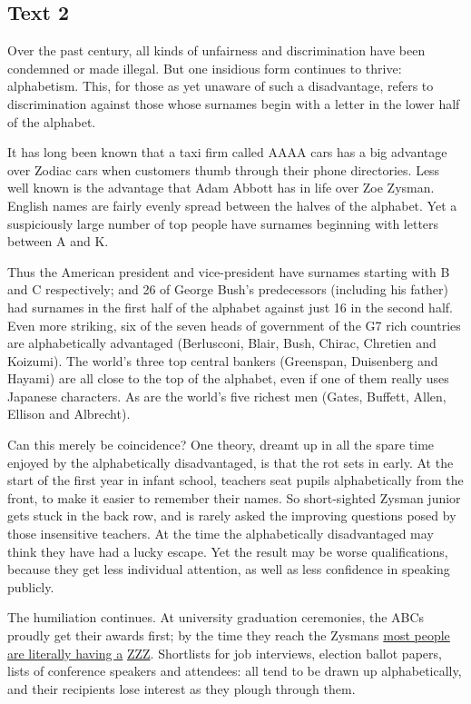 \documentclass[UTF8,11pt]{ctexart}
\begin{document}
\subsection*{\textbf{Text 2}}


Over the past century, all kinds of unfairness and discrimination have been condemned or made illegal. But one insidious form continues to thrive: alphabetism. This, for those as yet unaware of such a disadvantage, refers to discrimination against those whose surnames begin with a letter in the lower half of the alphabet.


It has long been known that a taxi firm called AAAA cars has a big advantage over Zodiac cars when customers thumb through their phone directories. Less well known is the advantage that Adam Abbott has in life over Zoe Zysman. English names are fairly evenly spread between the halves of the alphabet. Yet a suspiciously large number of top people have surnames beginning with letters between A and K.


Thus the American president and vice-president have surnames starting with B and C respectively; and 26 of George Bush’s predecessors (including his father) had surnames in the first half of the alphabet against just 16 in the second half. Even more striking, six of the seven heads of government of the G7 rich countries are alphabetically advantaged (Berlusconi, Blair, Bush, Chirac, Chretien and Koizumi). The world’s three top central bankers (Greenspan, Duisenberg and Hayami) are all close to the top of the alphabet, even if one of them really uses Japanese characters. As are the world’s five richest men (Gates, Buffett, Allen, Ellison and Albrecht).


Can this merely be coincidence? One theory, dreamt up in all the spare time enjoyed by the alphabetically disadvantaged, is that the rot sets in early. At the start of the first year in infant school, teachers seat pupils alphabetically from the front, to make it easier to remember their names. So short-sighted Zysman junior gets stuck in the back row, and is rarely asked the improving questions posed by those insensitive teachers. At the time the alphabetically disadvantaged may think they have had a lucky escape. Yet the result may be worse qualifications, because they get less individual attention, as well as less confidence in speaking publicly.


The humiliation continues. At university graduation ceremonies, the ABCs proudly get their awards first; by the time they reach the Zysmans \uline{most people are literally having a} \uline{ZZZ}. Shortlists for job interviews, election ballot papers, lists of conference speakers and attendees: all tend to be drawn up alphabetically, and their recipients lose interest as they plough through them.
\end{document}
